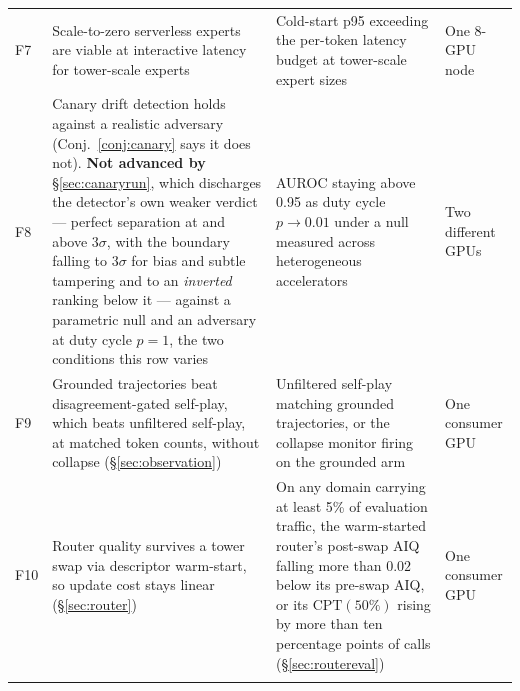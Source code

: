 \documentclass[11pt]{article}
\begin{document}
\begin{longtable}{@{}p{}p{}p{}p{}@{}}
\addlinespace
F7 & Scale-to-zero serverless experts are viable at interactive latency for tower-scale experts & Cold-start p95 exceeding the per-token latency budget at tower-scale expert sizes & One 8-GPU node \\
\addlinespace
F8 & Canary drift detection holds against a realistic adversary (Conj.~\ref{conj:canary} says it does not). \textbf{Not advanced by} \S\ref{sec:canaryrun}, which discharges the detector's own weaker verdict --- perfect separation at and above $3\sigma$, with the boundary falling to $3\sigma$ for bias and subtle tampering and to an \emph{inverted} ranking below it --- against a parametric null and an adversary at duty cycle $p=1$, the two conditions this row varies & AUROC staying above 0.95 as duty cycle $p\to0.01$ under a null measured across heterogeneous accelerators & Two different GPUs \\
\addlinespace
F9 & Grounded trajectories beat disagreement-gated self-play, which beats unfiltered self-play, at matched token counts, without collapse (\S\ref{sec:observation}) & Unfiltered self-play matching grounded trajectories, or the collapse monitor firing on the grounded arm & One consumer GPU \\
\addlinespace
F10 & Router quality survives a tower swap via descriptor warm-start, so update cost stays linear (\S\ref{sec:router}) & On any domain carrying at least 5\% of evaluation traffic, the warm-started router's post-swap AIQ \cite{hu2024routerbench} falling more than $0.02$ below its pre-swap AIQ, or its $\mathrm{CPT}(50\%)$ \cite{ong2024routellm} rising by more than ten percentage points of calls (\S\ref{sec:routereval}) & One consumer GPU \\
\addlinespace

\end{longtable}
\end{document}
